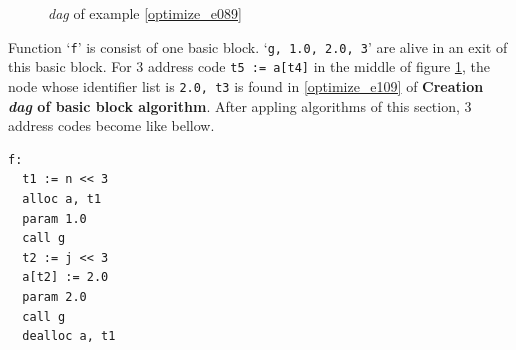\begin{Example}
\begin{figure}[htbp]
\begin{center}
\begin{latexonly}
\end{latexonly}
\caption{{\em dag} of example \ref{optimize_e089}}
\label{optimize_e090}
\end{center}
\end{figure}
Function `{\tt{f}}' is consist of one basic block.
`{\tt{g, 1.0, 2.0, 3}}' are
alive in an exit of this basic block.
For 3 address code {\tt{t5 := a[t4]}} in the middle of
figure \ref{optimize_e090},
the node whose identifier list is {\tt{2.0, t3}} is found 
in \ref{optimize_e109} of {\bf Creation {\em dag} of basic block
 algorithm}.
After appling algorithms of this section,
3 address codes become like bellow.
\begin{verbatim}
f:
  t1 := n << 3
  alloc a, t1
  param 1.0
  call g
  t2 := j << 3
  a[t2] := 2.0
  param 2.0
  call g
  dealloc a, t1
\end{verbatim}
\end{Example}

